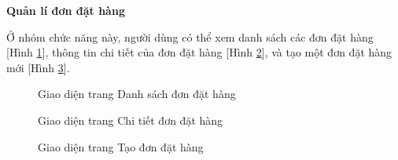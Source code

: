 \textbf{Quản lí đơn đặt hàng}

Ở nhóm chức năng này, người dùng có thể xem danh sách các đơn đặt hàng [Hình \ref{result_danh_sach_don_hang}], thông tin chi tiết của đơn đặt hàng [Hình \ref{result_chi_tiet_don_hang}], và tạo một đơn đặt hàng mới [Hình \ref{result_tao_don_hang}].

\begin{figure}[H]
    \begin{center}
        \caption{Giao diện trang Danh sách đơn đặt hàng}
        \label{result_danh_sach_don_hang}
    \end{center}
\end{figure}

\begin{figure}[H]
    \begin{center}
        \caption{Giao diện trang Chi tiết đơn đặt hàng}
        \label{result_chi_tiet_don_hang}
    \end{center}
\end{figure}

\begin{figure}[H]
    \begin{center}
        \caption{Giao diện trang Tạo đơn đặt hàng}
        \label{result_tao_don_hang}
    \end{center}
\end{figure}

